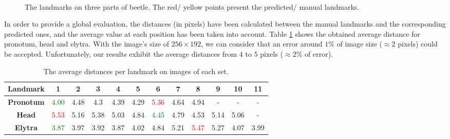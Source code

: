 \documentclass[review]{elsarticle}
\begin{document}
\begin{figure}[h!]
	\centering
    ~~
	~~
    \caption{The landmarks on three parts of beetle. The red/ yellow points present the predicted/ manual landmarks.}
    \label{figeb1}
\end{figure}

In order to provide a global evaluation, the distances (in pixels) have been calculated between the manual landmarks and the corresponding predicted ones, and the average value at each position has been taken into account. Table \ref{tblavgpronotum} shows the obtained average distance for pronotum, head and elytra. With the image's size of $256 \times 192$, we can consider that an error around $1\%$ of image size ($\approx 2$ pixels) could be accepted. Unfortunately, our results exhibit the average distances from $4$ to $5$ pixels ($\approx 2\%$ of error).

\begin{table}[h!]
	\centering	
	\begin{tabular}{|c|c|c|c|c|c|c|c|c|c|c|c|}
		\hline
		\textbf{Landmark} & 1 & 2 & 3 & 4 & 5 & 6 & 7 & 8 & 9 & 10 & 11 \\ \hline
		\textbf{Pronotum} & \textcolor{green}{4.00} & 4.48 & 4.3 & 4.39 & 4.29 & \textcolor{red}{5.36} & 4.64 & 4.94 & - & - & - \\ \hline
		\textbf{Head} & \textcolor{red}{5.53} & 5.16 & 5.38 & 5.03 & 4.84 & \textcolor{green}{4.45} & 4.79 & 4.53 & 5.14 & 5.06 & - \\ \hline
		\textbf{Elytra} & \textcolor{green}{3.87} & 3.97 & 3.92 & 3.87 & 4.02 & 4.84 & 5.21 & \textcolor{red}{5.47} & 5.27 & 4.07 & 3.99 \\ \hline
	\end{tabular}
	\caption{The average distances per landmark on images of each set.}
	\label{tblavgpronotum}
\end{table}
\end{document}
